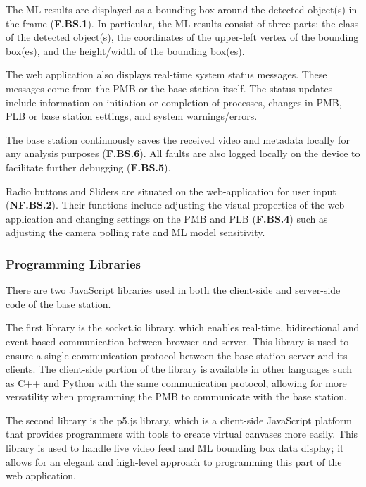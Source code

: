 The ML results are displayed as a bounding box around the detected object(s) in the frame (\textbf{F.BS.1}). In particular, the ML results consist of three parts: the class of the detected object(s), the coordinates of the upper-left vertex of the bounding box(es), and the height/width of the bounding box(es).

The web application also displays real-time system status messages. These messages come from the PMB or the base station itself. The status updates include information on initiation or completion of processes, changes in PMB, PLB or base station settings, and system warnings/errors.

The base station continuously saves the received video and metadata locally for any analysis purposes (\textbf{F.BS.6}). All faults are also logged locally on the device to facilitate further debugging (\textbf{F.BS.5}).

Radio buttons and Sliders are situated on the web-application for user input (\textbf{NF.BS.2}). Their functions include adjusting the visual properties of the web-application and changing settings on the PMB and PLB (\textbf{F.BS.4}) such as adjusting the camera polling rate and ML model sensitivity.

\subsubsection{Programming Libraries}

There are two JavaScript libraries used in both the client-side and server-side code of the base station.

The first library is the socket.io library, which enables real-time, bidirectional and event-based communication between browser and server. This library is used to ensure a single communication protocol between the base station server and its clients. The client-side portion of the library is available in other languages such as C++ and Python with the same communication protocol, allowing for more versatility when programming the PMB to communicate with the base station. 

The second library is the p5.js library, which is a client-side JavaScript platform that provides programmers with tools to create virtual canvases more easily. This library is used to handle live video feed and ML bounding box data display; it allows for an elegant and high-level approach to programming this part of the web application. 